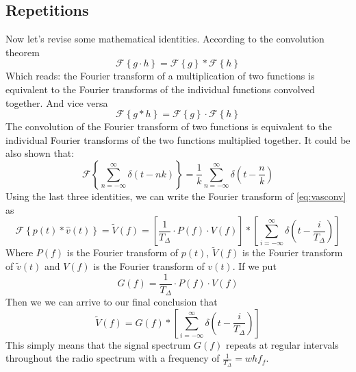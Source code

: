 \documentclass[a4paper,12pt,twoside,openright]{report}
\begin{document}
\subsection{Repetitions}
Now let's revise some mathematical identities. According to the convolution theorem \cite{arfkenconvolution}
\begin{equation}
\mathcal{F} \left\{ g \cdot h \right\} = \mathcal{F} \left\{ g \right\} \ast  \mathcal{F} \left\{ h \right\}
\end{equation}
Which reads: the Fourier transform of a multiplication of two functions is equivalent to the Fourier transforms of the individual functions convolved together. And vice versa
\begin{equation}
\mathcal{F} \left\{ g \ast h \right\} = \mathcal{F} \left\{ g \right\} \cdot  \mathcal{F} \left\{ h \right\}
\end{equation}
The convolution of the Fourier transform of two functions is equivalent to the individual Fourier transforms of the two functions multiplied together.
It could be also shown that:
\begin{equation}
\mathcal{F} \left\{ \sum\limits_{n=-\infty}^{\infty}  \delta(t-n k) \right\} = \frac{1}{k} \sum\limits_{n=-\infty}^{\infty}  \delta \left( t-\frac{n}{k} \right)
\end{equation}
Using the last three identities, we can write the Fourier transform of \ref{eq:vasconv} as
\begin{equation} 
\mathcal{F} \left\{ p(t) \ast \hat{v}(t) \right\} = \tilde{V}(f) =
\left[ \frac{1}{T_{\Delta}} \cdot P(f) \cdot V(f) \right] \ast
\left[ \sum\limits_{i=-\infty}^{\infty}  \delta \left( t-\frac{i}{T_{\Delta}} \right) \right]
\end{equation}
Where $P(f)$ is the Fourier transform of $p(t)$, $\tilde{V}(f)$ is the Fourier transform of $\tilde{v}(t)$ and $V(f)$ is the Fourier transform of $v(t)$. If we put 
\begin{equation} 
\label{eq:gfdef}
G(f) = \frac{1}{T_{\Delta}} \cdot P(f) \cdot V(f)
\end{equation}
Then we we can arrive to our final conclusion that
\begin{equation}
\label{eq:vspectrum}
\tilde{V}(f) = G(f) \ast
\left[ \sum\limits_{i=-\infty}^{\infty}  \delta \left( t-\frac{i}{T_{\Delta}} \right) \right]
\end{equation}
This simply means that the signal spectrum $G(f)$ repeats at regular intervals throughout the radio spectrum with a frequency of $\frac{1}{T_{\Delta}} = w h f_{f}$.
\end{document}
